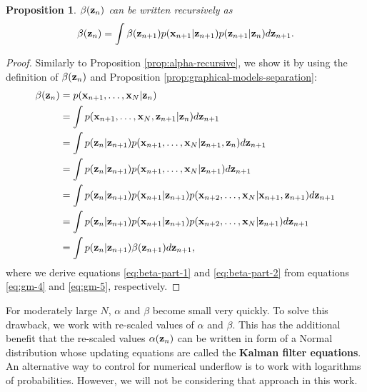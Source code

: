 \documentclass[12pt, oneside]{book}
\numberwithin{equation}{section}
\newcommand{\x}{{\bf x}}
\newcommand{\z}{{\bf z}}
\newtheorem{proposition}{Proposition}[section]
\begin{document}
{%
\begin{proposition} \label{prop:beta-recursive}
	$\beta(\z_n)$ can be written recursively as
	\begin{equation}
		\beta(\z_n) = \int  \beta(\z_{n+1})p(\x_{n+1}\vert \z_{n+1}) p(\z_{n+1}\vert \z_n) d\z_{n+1}.
	\end{equation} 
\end{proposition}

\begin{proof}
	Similarly to Proposition \ref{prop:alpha-recursive}, we show it by using the definition of $\beta(\z_n)$ and Proposition \ref{prop:graphical-models-separation}:
	\begin{align}
		\beta(\z_n) &= p(\x_{n+1}, \ldots, \x_N \vert \z_n)\\
		&= \int p(\x_{n+1}, \ldots, \x_N, \z_{n+1} \vert \z_n) d\z_{n+1} \\
		&= \int p(\z_n \vert \z_{n+1}) p(\x_{n+1}, \ldots, \x_N \vert \z_{n+1}, \z_n) d\z_{n+1} \\
		&= \int p(\z_n \vert \z_{n+1}) p(\x_{n+1}, \ldots, \x_N \vert \z_{n+1}) d\z_{n+1} \label{eq:beta-part-1} \\
		&= \int p(\z_n \vert \z_{n+1}) p(\x_{n+1} \vert \z_{n+1}) p(\x_{n+2}, \ldots, \x_N \vert \x_{n+1}, \z_{n+1}) d\z_{n+1} \\
		&= \int p(\z_n \vert \z_{n+1}) p(\x_{n+1} \vert \z_{n+1}) p(\x_{n+2}, \ldots, \x_N \vert \z_{n+1}) d\z_{n+1} \label{eq:beta-part-2}\\
		&= \int p(\z_n \vert \z_{n+1}) \beta(\z_{n+1}) d\z_{n+1},
	\end{align}
	where we derive equations \eqref{eq:beta-part-1} and \eqref{eq:beta-part-2} from equations \eqref{eq:gm-4} and \eqref{eq:gm-5}, respectively.
\end{proof}

For moderately large $N$, $\alpha$ and $\beta$ become small very quickly. To solve this drawback, we work with re-scaled values of $\alpha$ and $\beta$. This has the additional benefit that the re-scaled values $\alpha(\z_n)$ can be written in form of a Normal distribution whose updating equations are  called the \textbf{Kalman filter equations}. An alternative way to control for numerical underflow is to work with logarithms of probabilities. However, we will not be considering that approach in this work.

}
\end{document}
